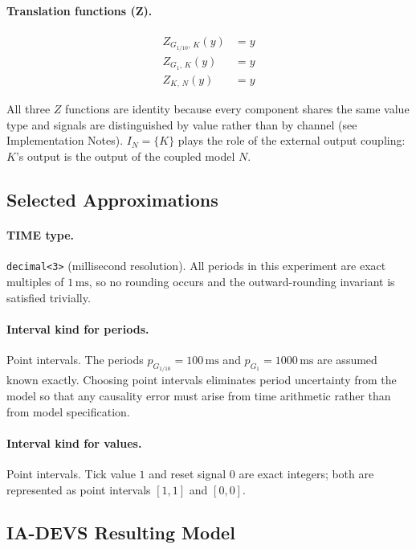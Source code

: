 \paragraph{Translation functions (Z).}
\begin{align*}
  Z_{G_{1/10},\,K}(y) &= y \\
  Z_{G_1,\,K}(y)      &= y \\
  Z_{K,\,N}(y)        &= y
\end{align*}

All three $Z$ functions are identity because every component shares the same
value type and signals are distinguished by value rather than by channel
(see Implementation Notes).  $I_N = \{K\}$ plays the role of the external
output coupling: $K$'s output is the output of the coupled model $N$.

\subsection*{Selected Approximations}

\paragraph{TIME type.}  \texttt{decimal<3>} (millisecond resolution).
All periods in this experiment are exact multiples of $1\,\text{ms}$,
so no rounding occurs and the outward-rounding invariant is satisfied
trivially.

\paragraph{Interval kind for periods.}  Point intervals.
The periods $p_{G_{1/10}} = 100\,\text{ms}$ and $p_{G_1} = 1000\,\text{ms}$
are assumed known exactly.  Choosing point intervals eliminates period
uncertainty from the model so that any causality error must arise from time
arithmetic rather than from model specification.

\paragraph{Interval kind for values.}  Point intervals.  Tick value $1$ and reset
signal $0$ are exact integers; both are represented as point intervals
$[1,1]$ and $[0,0]$.

\subsection*{IA-DEVS Resulting Model}

